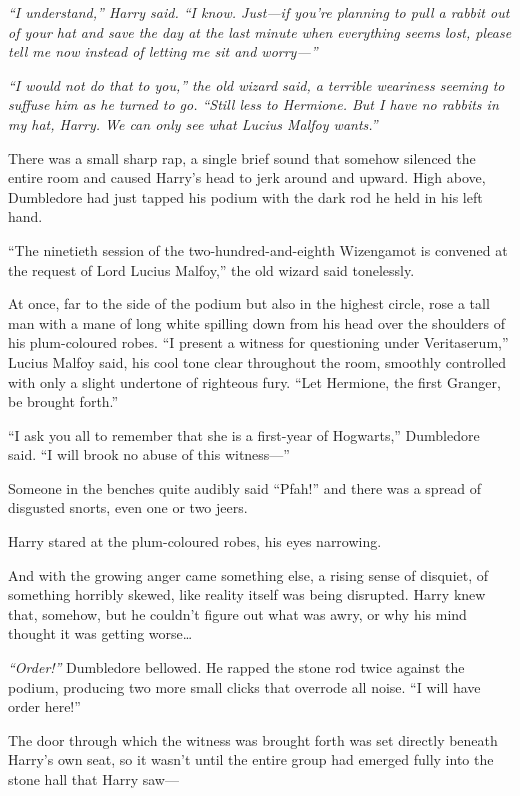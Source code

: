 \emph{``I understand,'' Harry said. ``I know. Just---if you're planning
to pull a rabbit out of your hat and save the day at the last minute
when everything seems lost, please tell me now instead of letting me sit
and worry---''}

\emph{``I would not do that to you,'' the old wizard said, a terrible
weariness seeming to suffuse him as he turned to go. ``Still less to
Hermione. But I have no rabbits in my hat, Harry. We can only see what
Lucius Malfoy wants.''}

There was a small sharp rap, a single brief sound that somehow silenced
the entire room and caused Harry's head to jerk around and upward. High
above, Dumbledore had just tapped his podium with the dark rod he held
in his left hand.

``The ninetieth session of the two-hundred-and-eighth Wizengamot is
convened at the request of Lord Lucius Malfoy,'' the old wizard said
tonelessly.

At once, far to the side of the podium but also in the highest circle,
rose a tall man with a mane of long white spilling down from his head
over the shoulders of his plum-coloured robes. ``I present a witness for
questioning under Veritaserum,'' Lucius Malfoy said, his cool tone clear
throughout the room, smoothly controlled with only a slight undertone of
righteous fury. ``Let Hermione, the first Granger, be brought forth.''

``I ask you all to remember that she is a first-year of Hogwarts,''
Dumbledore said. ``I will brook no abuse of this witness---''

Someone in the benches quite audibly said ``Pfah!'' and there was a
spread of disgusted snorts, even one or two jeers.

Harry stared at the plum-coloured robes, his eyes narrowing.

And with the growing anger came something else, a rising sense of
disquiet, of something horribly skewed, like reality itself was being
disrupted. Harry knew that, somehow, but he couldn't figure out what was
awry, or why his mind thought it was getting worse\ldots{}

\emph{``Order!''} Dumbledore bellowed. He rapped the stone rod twice
against the podium, producing two more small clicks that overrode all
noise. ``I will have order here!''

The door through which the witness was brought forth was set directly
beneath Harry's own seat, so it wasn't until the entire group had
emerged fully into the stone hall that Harry saw---

